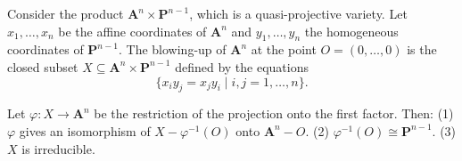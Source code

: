 Consider the product $\mathbf{A}^n \times \mathbf{P}^{n-1}$, which is a quasi-projective variety. Let $x_1, \ldots, x_n$ be the affine coordinates of $\mathbf{A}^n$ and $y_1, \ldots, y_n$ the homogeneous coordinates of $\mathbf{P}^{n-1}$. The blowing-up of $\mathbf{A}^n$ at the point $O = (0, \ldots, 0)$ is the closed subset $X \subseteq \mathbf{A}^n \times \mathbf{P}^{n-1}$ defined by the equations
$$\{x_i y_j = x_j y_i \mid i, j = 1, \ldots, n\}.$$

Let $\varphi: X \to \mathbf{A}^n$ be the restriction of the projection onto the first factor. Then:
(1) $\varphi$ gives an isomorphism of $X - \varphi^{-1}(O)$ onto $\mathbf{A}^n - O$.
(2) $\varphi^{-1}(O) \cong \mathbf{P}^{n-1}$.
(3) $X$ is irreducible.
